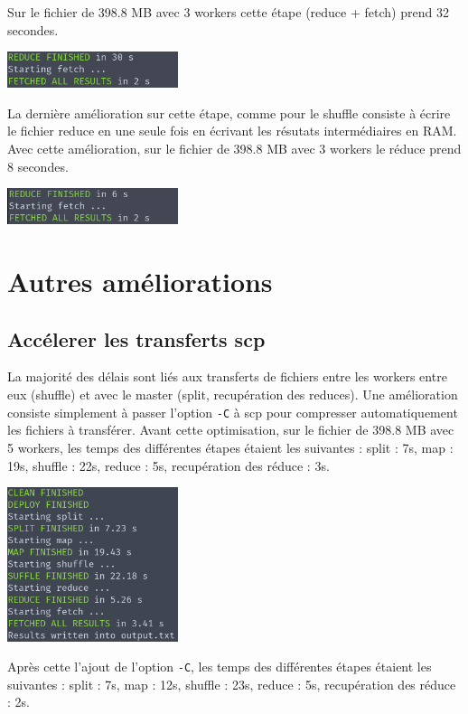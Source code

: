 \documentclass[11pt,a4paper]{article}
\begin{document}
Sur le fichier de 398.8 MB avec 3 workers cette étape (reduce + fetch) prend 32 secondes.

\includegraphics[width=5cm]{screenshot_reduce3.png}

La dernière amélioration sur cette étape, comme pour le shuffle consiste à écrire le fichier reduce en une seule fois en écrivant les résutats intermédiaires en RAM. Avec cette amélioration, sur le fichier de 398.8 MB avec 3 workers le réduce prend 8 secondes.

\includegraphics[width=5cm]{screenshot_reduce4.png}

\section{Autres améliorations}
\subsection*{Accélerer les transferts scp}
La majorité des délais sont liés aux transferts de fichiers entre les workers entre eux (shuffle) et avec le master (split, recupération des reduces). Une amélioration consiste simplement à passer l'option \texttt{-C} à scp pour compresser automatiquement les fichiers à transférer. Avant cette optimisation, sur le fichier de 398.8 MB avec 5 workers, les temps des différentes étapes étaient les suivantes : split : 7s, map : 19s, shuffle : 22s, reduce : 5s, recupération des réduce : 3s.

\includegraphics[width=5cm]{screenshot8.png}

Après cette l'ajout de l'option \texttt{-C}, les temps des différentes étapes étaient les suivantes : split : 7s, map : 12s, shuffle : 23s, reduce : 5s, recupération des réduce : 2s.
\end{document}

